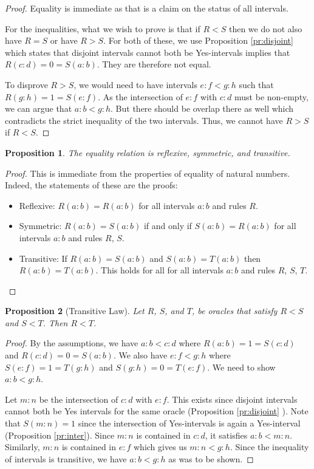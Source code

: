 \documentclass[12pt]{article}
\newtheorem{proposition}{Proposition}
\theoremstyle{remark}
\begin{document}
\begin{proof}
Equality is immediate as that is a claim on the status of all intervals. 

For the inequalities, what we wish to prove is that if $R < S$ then we do not also have $R=S$ or have $R > S$. For both of these, we use Proposition \ref{pr:disjoint} which states that disjoint intervals cannot both be Yes-intervals implies that $R(c:d) = 0 = S(a:b)$. They are therefore not equal. 

To disprove $R > S$, we would need to have intervals $e:f < g:h$ such that $R(g:h) = 1 = S(e:f)$.  As the intersection of $e:f$ with $c:d$ must be non-empty, we can argue that $a:b < g:h$. But there should be overlap there as well which contradicts the strict inequality of the two intervals. Thus, we cannot have $R>S$ if $R < S$.
\end{proof}

\begin{proposition}\label{pr:reflexive}
The equality relation is reflexive, symmetric, and transitive. 
\end{proposition}

\begin{proof}
This is immediate from the properties of equality of natural numbers. Indeed, the statements of these are the proofs:
\begin{itemize}
    \item Reflexive: $R(a:b)=R(a:b)$ for all intervals $a:b$ and rules $R$.
    \item Symmetric: $R(a:b)=S(a:b)$ if and only if $S(a:b) = R(a:b)$ for all intervals $a:b$ and rules $R$, $S$.
    \item Transitive: If $R(a:b)=S(a:b)$ and $S(a:b) = T(a:b)$ then $R(a:b)=T(a:b)$. This holds for all for all intervals $a:b$ and rules $R$, $S$, $T$.
\end{itemize}
\end{proof}

\begin{proposition}[Transitive Law]\label{pr:transitive}
Let $R$, $S$, and $T$, be oracles that satisfy $R<S$ and $S < T$. Then $R < T$.
\end{proposition}

\begin{proof}
By the assumptions, we have $a:b < c:d$ where $R(a:b) = 1 = S(c:d)$ and $R(c:d) = 0 = S(a:b)$. We also have $e:f < g:h$ where $S(e:f) = 1 = T(g:h)$ and $S(g:h) = 0 = T(e:f)$. We need to show $a:b < g:h$.

Let $m:n$ be the intersection of $c:d$ with $e:f$. This exists since disjoint intervals cannot both be Yes intervals for the same oracle (Proposition \ref{pr:disjoint} ). Note that $S(m:n) = 1$ since the intersection of Yes-intervals is again a Yes-interval (Proposition \ref{pr:inter}). Since $m:n$ is contained in $c:d$, it satisfies $a:b < m:n$. Similarly, $m:n$ is contained in $e:f$ which gives us $m:n < g:h$. Since the inequality of intervals is transitive, we have $a:b < g:h$ as was to be shown. 
\end{proof}
\end{document}
